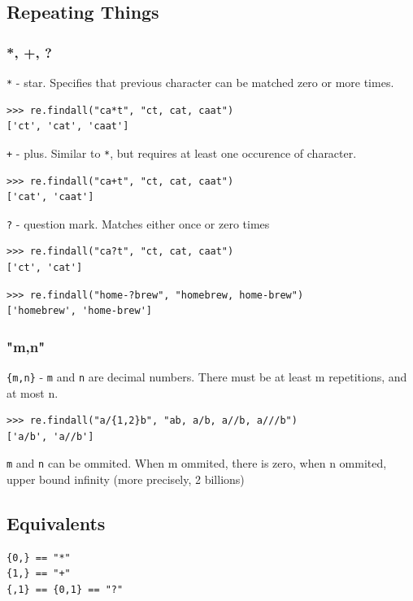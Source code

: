 \documentclass{beamer}
\begin{document}
\subsection{Repeating Things}
\subsubsection{*, +, ?}
\begin{frame}[fragile]
\verb/*/ - star. Specifies that previous character can be matched zero or more times.
\begin{lstlisting}
>>> re.findall("ca*t", "ct, cat, caat")
['ct', 'cat', 'caat']
\end{lstlisting}
\pause
\verb/+/ - plus. Similar to \verb/*/, but requires at least one occurence of character.
\begin{lstlisting}
>>> re.findall("ca+t", "ct, cat, caat")
['cat', 'caat']
\end{lstlisting}
\pause
\verb/?/ - question mark. Matches either once or zero times
\begin{lstlisting}
>>> re.findall("ca?t", "ct, cat, caat")
['ct', 'cat']
\end{lstlisting}
\pause
\begin{lstlisting}
>>> re.findall("home-?brew", "homebrew, home-brew")
['homebrew', 'home-brew']
\end{lstlisting}
\end{frame}

\subsubsection{"{m,n}"}
\begin{frame}[fragile]
\verb/{m,n}/ - \verb/m/ and \verb/n/ are decimal numbers. There must be at least m repetitions, and at most n.
\begin{lstlisting}
>>> re.findall("a/{1,2}b", "ab, a/b, a//b, a///b")
['a/b', 'a//b']
\end{lstlisting}
\pause
\verb/m/ and \verb/n/ can be ommited. When m ommited, there is zero, when n ommited, upper bound infinity (more precisely, 2 billions)
\end{frame}

\subsection{Equivalents}
\begin{frame}[fragile]
\begin{verbatim}
{0,} == "*"
{1,} == "+"
{,1} == {0,1} == "?"
\end{verbatim}
\end{frame}
\end{document}
